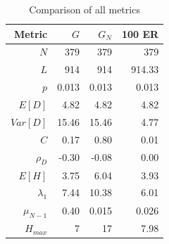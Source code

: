\documentclass{article}
\begin{document}
\begin{table}[H]
  \centering
  \begin{tabular}{r|rrr}
    \toprule
Metric      & $G$   & $G_N$ & 100 ER \\
\midrule
$N$         & 379   & 379   & 379    \\
$L$         & 914   & 914   & 914.33 \\
$p$         & 0.013 & 0.013 & 0.013  \\
$E[D]$      & 4.82  & 4.82  & 4.82   \\
$Var[D]$    & 15.46 & 15.46 & 4.77   \\
$C$         & 0.17  & 0.80  & 0.01  \\
$\rho_D$    & -0.30 & -0.08 & 0.00   \\
$E[H]$      & 3.75  & 6.04  & 3.93   \\
$\lambda_1$ & 7.44  & 10.38 & 6.01   \\
$\mu_{N-1}$ & 0.40  & 0.015 & 0.026  \\
$H_{max}$   & 7     & 17    & 7.98   \\
\bottomrule
  \end{tabular}
  \caption{Comparison of all metrics}
\end{table}
\end{document}
